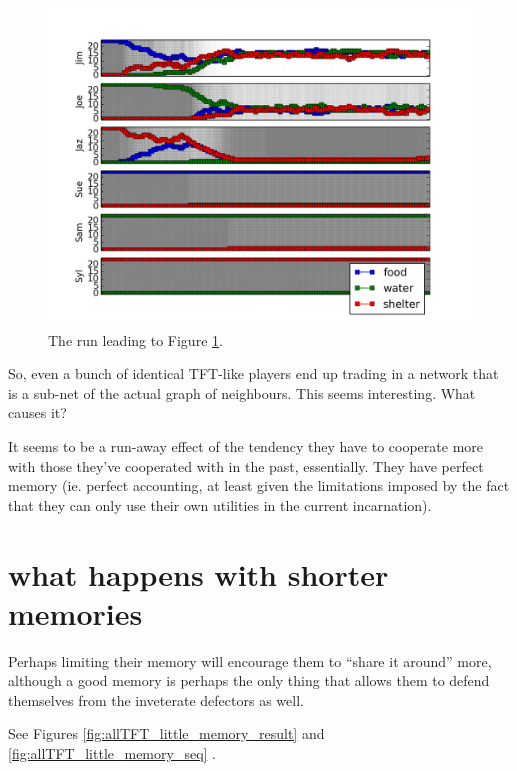 \documentclass[11pt]{article}
\begin{document}
\begin{figure}[b]
\includegraphics[width=\textwidth]{twotribes_good_memory_seq}
\caption{\label{fig:twotribes_good_memory_seq} 
The run leading to Figure \ref{fig:twotribes_good_memory_seq}. }
\end{figure}

So, even a bunch of identical TFT-like players end up trading in a
network that is a sub-net of the actual graph of neighbours. This
seems interesting. What causes it?

It seems to be a run-away effect of the tendency they have to
cooperate more with those they've cooperated with in the past,
essentially. They have perfect memory (ie. perfect accounting, at
least given the limitations imposed by the fact that they can only use
their own utilities in the current incarnation).

\section{what happens with shorter memories}

Perhaps limiting their memory will encourage them to ``share it
around'' more, although a good memory is perhaps the only thing that
allows them to defend themselves from the inveterate defectors as
well.

See Figures \ref{fig:allTFT_little_memory_result}  and \ref{fig:allTFT_little_memory_seq} .
\end{document}
